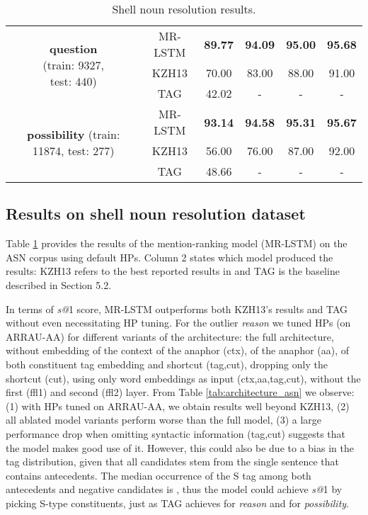 \documentclass[11pt,letterpaper]{article}
\begin{document}
\begin{table}[t]
{\begin{tabular}{c|c|cccc}
\midrule																	  
 \multirow{3}{*}{\parbox{0.28\linewidth}{\centering \textbf{question}\\ (train: 9327,\\ test: 440)}}      & MR-LSTM     & \textbf{89.77} & \textbf{94.09} & \textbf{95.00} & \textbf{95.68} \\
																	  & KZH13        & 70.00 & 83.00 & 88.00 & 91.00 \\
																	  & TAG & 42.02 & -     & -     & -     \\
\midrule																	  
 \multirow{3}{*}{\parbox{0.28\linewidth}{\centering \textbf{possibility} (train: 11874, test: 277)}} & MR-LSTM     & \textbf{93.14} & \textbf{94.58} & \textbf{95.31} & \textbf{95.67} \\
																	  & KZH13        & 56.00 & 76.00 & 87.00 & 92.00 \\
																	  & TAG & 48.66 & -     & -     & -\\                              
\bottomrule
\end{tabular}
}
\caption{Shell noun resolution results. }\label{tab:results_asn}
\end{table}


 
\subsection{Results on shell noun resolution dataset}




Table \ref{tab:results_asn} provides the results of the mention-ranking model (MR-LSTM) on the ASN corpus using default HPs. Column 2 states which model produced the results: KZH13 refers to the best reported results in \citet{kolhatkar-zinsmeister-hirst:2013:EMNLP} and TAG is the baseline described in Section 5.2.   


In terms of \textit{s@}1 score, MR-LSTM outperforms both KZH13's results and TAG without even necessitating HP tuning. For the outlier \textit{reason} we tuned HPs (on ARRAU-AA) for different variants of the architecture: the full architecture, without embedding of the context of the anaphor (ctx), of the anaphor (aa), of both constituent tag embedding and shortcut (tag,cut), dropping only the shortcut (cut), using only word embeddings as input 
(ctx,aa,tag,cut),  without the first (ffl1) and second (ffl2) layer. From Table \ref{tab:architecture_asn} we observe:
(1) with HPs tuned on ARRAU-AA, we obtain results well beyond KZH13, (2) all ablated model variants perform worse than the full model, (3) a large performance drop when omitting syntactic information (tag,cut) suggests that the model makes good use of it. However, this could also be due to a
bias in the tag distribution, given that all candidates stem from the single sentence that contains antecedents. The median occurrence of the S tag among both antecedents and negative candidates is , thus the model could achieve  \textit{s@}1 by picking S-type constituents, just as TAG achieves  for \textit{reason} and 
 for \textit{possibility}.
\end{document}
